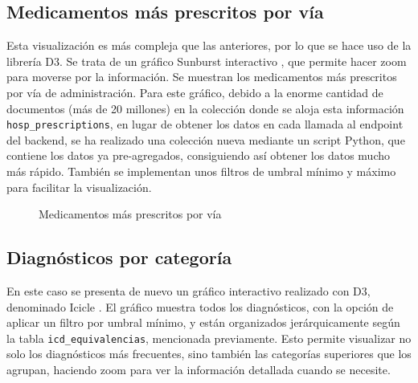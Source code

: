 \subsection{Medicamentos más prescritos por vía}
Esta visualización es más compleja que las anteriores, por lo que se hace uso de la librería D3. Se trata de un gráfico Sunburst interactivo \cite{sunburst}, que permite hacer zoom para moverse por la información. Se muestran los medicamentos más prescritos por vía de administración. Para este gráfico, debido a la enorme cantidad de documentos (más de 20 millones) en la colección donde se aloja esta información \texttt{hosp\_prescriptions}, en lugar de obtener los datos en cada llamada al endpoint del backend, se ha realizado una colección nueva mediante un script Python, que contiene los datos ya pre-agregados, consiguiendo así obtener los datos mucho más rápido. También se implementan unos filtros de umbral mínimo y máximo para facilitar la visualización.
\begin{figure}[H]
  \centering
  \caption{Medicamentos más prescritos por vía}
  \label{fig:chart-sunburst}
\end{figure}

\subsection{Diagnósticos por categoría}
En este caso se presenta de nuevo un gráfico interactivo realizado con D3, denominado Icicle \cite{icicle}. El gráfico muestra todos los diagnósticos, con la opción de aplicar un filtro por umbral mínimo, y están organizados jerárquicamente según la tabla \texttt{icd\_equivalencias}, mencionada previamente. Esto permite visualizar no solo los diagnósticos más frecuentes, sino también las categorías superiores que los agrupan, haciendo zoom para ver la información detallada cuando se necesite. 

